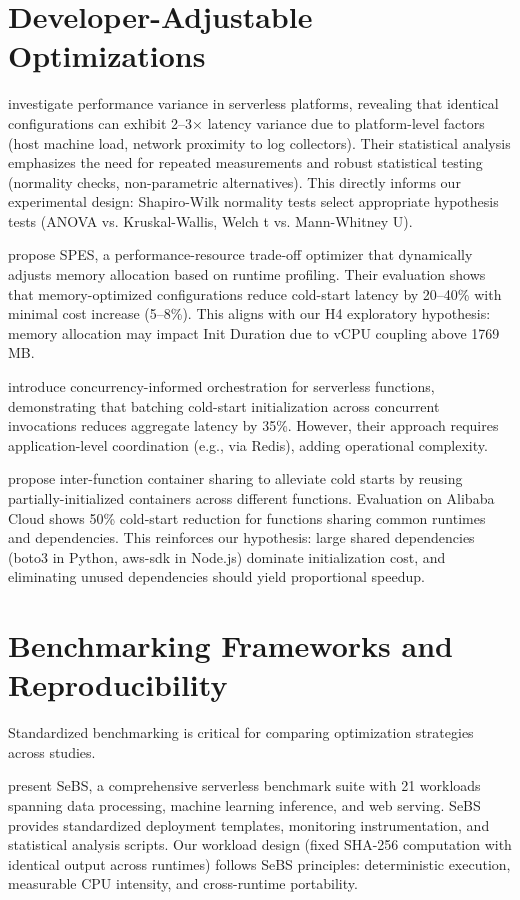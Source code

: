 \section{Developer-Adjustable Optimizations}

\citet{wen2025variance} investigate performance variance in serverless platforms, revealing that identical configurations can exhibit 2–3× latency variance due to platform-level factors (host machine load, network proximity to log collectors). Their statistical analysis emphasizes the need for repeated measurements and robust statistical testing (normality checks, non-parametric alternatives). This directly informs our experimental design: Shapiro-Wilk normality tests select appropriate hypothesis tests (ANOVA vs. Kruskal-Wallis, Welch t vs. Mann-Whitney U).

\citet{lee2024spes} propose SPES, a performance-resource trade-off optimizer that dynamically adjusts memory allocation based on runtime profiling. Their evaluation shows that memory-optimized configurations reduce cold-start latency by 20–40\% with minimal cost increase (5–8\%). This aligns with our H4 exploratory hypothesis: memory allocation may impact Init Duration due to vCPU coupling above 1769 MB.

\citet{liu2025cidre} introduce concurrency-informed orchestration for serverless functions, demonstrating that batching cold-start initialization across concurrent invocations reduces aggregate latency by 35\%. However, their approach requires application-level coordination (e.g., via Redis), adding operational complexity.

\citet{li2022help} propose inter-function container sharing to alleviate cold starts by reusing partially-initialized containers across different functions. Evaluation on Alibaba Cloud shows 50\% cold-start reduction for functions sharing common runtimes and dependencies. This reinforces our hypothesis: large shared dependencies (boto3 in Python, aws-sdk in Node.js) dominate initialization cost, and eliminating unused dependencies should yield proportional speedup.

\section{Benchmarking Frameworks and Reproducibility}

Standardized benchmarking is critical for comparing optimization strategies across studies.

\citet{copik2021sebs} present SeBS, a comprehensive serverless benchmark suite with 21 workloads spanning data processing, machine learning inference, and web serving. SeBS provides standardized deployment templates, monitoring instrumentation, and statistical analysis scripts. Our workload design (fixed SHA-256 computation with identical output across runtimes) follows SeBS principles: deterministic execution, measurable CPU intensity, and cross-runtime portability.

